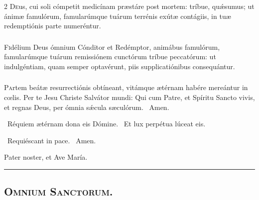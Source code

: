 \documentclass[9pt,twoside]{extarticle}
\begin{document}
\begin{multicols}{2}
\lettrine{D}eus, cui soli cómpetit medicínam præstáre post mortem: tríbue, quǽsumus; ut ánimæ famulórum, famularúmque tuárum terrénis exútæ contágiis, in tuæ redemptiónis parte numeréntur.

\subsubsection*{\center {}}
\lettrine{F}idélium Deus ómnium Cónditor et Redémptor, animábus famulórum, famularúmque tuárum remissiónem cunctórum tríbue peccatórum: ut indulgéntiam, quam semper optavérunt, piis supplicatiónibus consequántur.

\subsubsection*{\center {}}
\lettrine{P}artem beátæ resurrectiónis obtíneant, vitámque ætérnam habére mereántur in cœlis. Per te Jesu Christe Salvátor mundi: Qui cum Patre, et Spíritu Sancto vivis, et regnas Deus, per ómnia sǽcula sæculórum. ~Amen.

\begin{tightlist}{}
\item {}~Réquiem ætérnam dona eis Dómine. ~Et lux perpétua lúceat eis.
\item {}~Requiéscant in pace. ~Amen.
\item Pater noster, et Ave María.
\end{tightlist}

\begin{center}\textcolor{red}{\rule{\linewidth}{0.5pt}} \end{center}

\subsection*{\center {}}
\subsubsection*{\center {}}
\subsection*{\center \textsc{Omnium Sanctorum.}}
\subsubsection*{\center {}}


\end{multicols}
\end{document}
